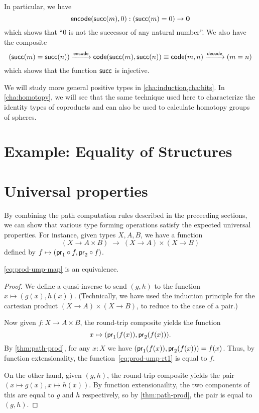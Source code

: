 In particular, we have
\begin{equation}
  \encode(\suc(m),0) : (\suc(m)=0) \to \emptyt\label{eq:zero-not-succ}
\end{equation}
which shows that ``$0$ is not the successor of any natural number''.
We also have the composite
\begin{equation}
  (\suc(m)=\suc(n)) \xrightarrow{\encode} \code(\suc(m),\suc(n)) \jdeq \code(m,n) \xrightarrow{\decode} (m=n)\label{eq:suc-injective}
\end{equation}
which shows that the function $\mathsf{succ}$ is injective.

We will study more general positive types in \autoref{cha:induction,cha:hits}.
In \autoref{cha:homotopy}, we will see that the same technique used here to characterize the identity types of coproducts and \nat can also be used to calculate homotopy groups of spheres.

\section{Example: Equality of Structures}



\section{Universal properties}
\label{sec:universal-properties}

By combining the path computation rules described in the preceeding sections, we can show that various type forming operations satisfy the expected universal properties.
For instance, given types $X,A,B$, we have a function
\begin{equation}
  (X\to A\times B) \;\to \; (X\to A)\times (X\to B)\label{eq:prod-ump-map}
\end{equation}
defined by $f \mapsto (\mathsf{pr}_{1} \circ f, \mathsf{pr}_{2}\circ f)$.

\begin{thm}\label{thm:prod-ump}
  \eqref{eq:prod-ump-map} is an equivalence.
\end{thm}
\begin{proof}
  We define a quasi-inverse to send $(g,h)$ to the function $x\mapsto (g(x),h(x))$.
  (Technically, we have used the induction principle for the cartesian product $(X\to A)\times (X\to B)$, to reduce to the case of a pair.)

  Now given $f:X\to A\times B$, the round-trip composite yields the function
  \begin{equation}
    x\mapsto (\proj1(f(x)),\proj2(f(x))).\label{eq:prod-ump-rt1}
  \end{equation}
  By \autoref{thm:path-prod}, for any $x:X$ we have $(\mathsf{pr}_{1}(f(x)),\mathsf{pr}_{2}(f(x))) = f(x)$.
  Thus, by function extensionality, the function~\eqref{eq:prod-ump-rt1} is equal to $f$.

  On the other hand, given $(g,h)$, the round-trip composite yields the pair $(x\mapsto g(x),x\mapsto h(x))$.
  By function extensionaility, the two components of this are equal to $g$ and $h$ respectively, so by \autoref{thm:path-prod}, the pair is equal to $(g,h)$.
\end{proof}

